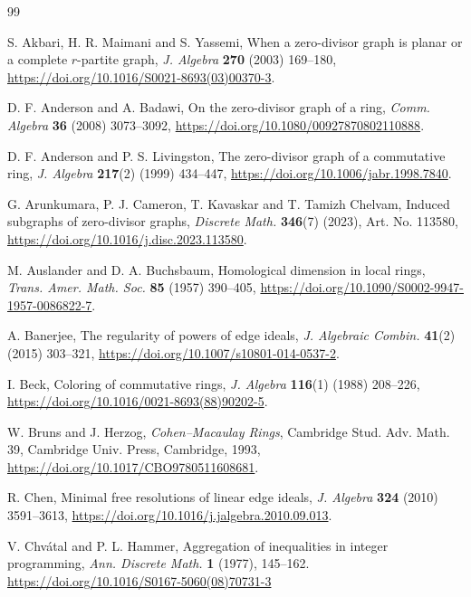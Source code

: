 \documentclass[12pt]{article}
\theoremstyle{definition}
\begin{document}
\begin{thebibliography}{99}

S. Akbari, H. R. Maimani and S. Yassemi,
When a zero-divisor graph is planar or a complete \(r\)-partite graph,
\emph{J. Algebra} \textbf{270} (2003) 169--180,
\url{https://doi.org/10.1016/S0021-8693(03)00370-3}.

D. F. Anderson and A. Badawi,
On the zero-divisor graph of a ring,
\emph{Comm. Algebra} \textbf{36} (2008) 3073--3092,
\url{https://doi.org/10.1080/00927870802110888}.

D. F. Anderson and P. S. Livingston,
The zero-divisor graph of a commutative ring,
\emph{J. Algebra} \textbf{217}(2) (1999) 434--447,
\url{https://doi.org/10.1006/jabr.1998.7840}.

G. Arunkumara, P. J. Cameron, T. Kavaskar and T. Tamizh Chelvam,
Induced subgraphs of zero-divisor graphs,
\emph{Discrete Math.} \textbf{346}(7) (2023), Art. No. 113580,
\url{https://doi.org/10.1016/j.disc.2023.113580}.

M. Auslander and D. A. Buchsbaum,
Homological dimension in local rings,
\emph{Trans. Amer. Math. Soc.} \textbf{85} (1957) 390--405,
\url{https://doi.org/10.1090/S0002-9947-1957-0086822-7}.

A. Banerjee,
The regularity of powers of edge ideals,
\emph{J. Algebraic Combin.} \textbf{41}(2) (2015) 303--321,
\url{https://doi.org/10.1007/s10801-014-0537-2}.

I. Beck,
Coloring of commutative rings,
\emph{J. Algebra} \textbf{116}(1) (1988) 208--226,
\url{https://doi.org/10.1016/0021-8693(88)90202-5}.

W. Bruns and J. Herzog,
\emph{Cohen--Macaulay Rings},
Cambridge Stud. Adv. Math. 39, Cambridge Univ. Press, Cambridge, 1993,
\url{https://doi.org/10.1017/CBO9780511608681}.

R. Chen,
Minimal free resolutions of linear edge ideals,
\emph{J. Algebra} \textbf{324} (2010) 3591--3613,
\url{https://doi.org/10.1016/j.jalgebra.2010.09.013}.

V. Chv\'atal and P. L. Hammer, Aggregation of inequalities in integer programming,
\emph{Ann. Discrete Math.} \textbf{1} (1977), 145--162.
\url{https://doi.org/10.1016/S0167-5060(08)70731-3}




\end{thebibliography}
\end{document}
